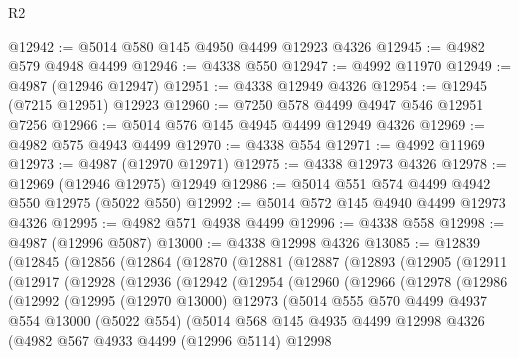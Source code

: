 \begin{lexlean}{R2}
\begin{coremodule}
@12942 := @5014 @580 @145 @4950 @4499 @12923 @4326
@12945 := @4982 @579 @4948 @4499
@12946 := @4338 @550
@12947 := @4992 @11970
@12949 := @4987 (@12946 @12947)
@12951 := @4338 @12949 @4326
@12954 := @12945 (@7215 @12951) @12923
@12960 := @7250 @578 @4499 @4947 @546 @12951 @7256
@12966 := @5014 @576 @145 @4945 @4499 @12949 @4326
@12969 := @4982 @575 @4943 @4499
@12970 := @4338 @554
@12971 := @4992 @11969
@12973 := @4987 (@12970 @12971)
@12975 := @4338 @12973 @4326
@12978 := @12969 (@12946 @12975) @12949
@12986 := @5014 @551 @574 @4499 @4942 @550 @12975 (@5022 @550)
@12992 := @5014 @572 @145 @4940 @4499 @12973 @4326
@12995 := @4982 @571 @4938 @4499
@12996 := @4338 @558
@12998 := @4987 (@12996 @5087)
@13000 := @4338 @12998 @4326
@13085 := @12839
    (@12845
      (@12856
        (@12864
          (@12870
            (@12881
              (@12887
                (@12893
                  (@12905
                    (@12911
                      (@12917
                        (@12928
                          (@12936
                            (@12942
                              (@12954
                                (@12960
                                  (@12966
                                    (@12978
                                      (@12986
                                        (@12992
                                          (@12995
                                            (@12970 @13000)
                                            @12973
                                            (@5014
                                              @555
                                              @570
                                              @4499
                                              @4937
                                              @554
                                              @13000
                                              (@5022 @554)
                                              (@5014
                                                @568
                                                @145
                                                @4935
                                                @4499
                                                @12998
                                                @4326
                                                (@4982
                                                  @567
                                                  @4933
                                                  @4499
                                                  (@12996 @5114)
                                                  @12998

\end{coremodule}
\end{lexlean}
